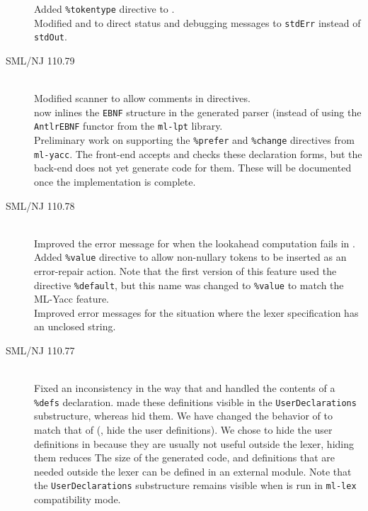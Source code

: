 \begin{description}
    Added \texttt{\%tokentype} directive to \mlantlr{}.
    \\[0.5em]
    Modified \mlantlr{} and \ulex{} to direct status and debugging messages to
    \texttt{stdErr} instead of \texttt{stdOut}.
%
 \item[SML/NJ 110.79]
    \mbox{}\\[0.5em]
    Modified scanner to allow comments in \ulex{} directives.
    \\[0.5em]
    \mlantlr{} now inlines the \texttt{EBNF} structure in the generated parser (instead of using
    the \texttt{AntlrEBNF} functor from the \texttt{ml-lpt} library.
    \\[0.5em]
    Preliminary work on supporting the \texttt{\%prefer} and \texttt{\%change} directives
    from \texttt{ml-yacc}.  The front-end accepts and checks these declaration forms, but
    the back-end does not yet generate code for them.  These will be documented once the
    implementation is complete.
%
  \item[SML/NJ 110.78]
    \mbox{}\\[0.5em]
    Improved the error message for when the lookahead computation fails in \mlantlr{}.
    \\[0.5em]
    Added \texttt{\%value} directive to allow non-nullary tokens to be inserted as
    an error-repair action.
    Note that the first version of this feature used the directive \texttt{\%default}, but
    this name was changed to \texttt{\%value} to match the ML-Yacc feature.
    \\[0.5em]
    Improved error messages for the situation where the lexer specification has an unclosed string.
%
  \item[SML/NJ 110.77]
    \mbox{}\\[0.5em]
    Fixed an inconsistency in the way that \mlantlr{} and \ulex{} handled the contents of
    a \texttt{\%defs} declaration.  \ulex{} made these definitions visible in the \texttt{UserDeclarations}
    substructure, whereas \mlantlr{} hid them.  We have changed the behavior of \ulex{} to match
    that of \mlantlr{} (\ie{}, hide the user definitions).  We chose to hide the user definitions
    in \ulex{} because they are usually not useful outside the lexer, hiding them reduces The
    size of the generated code, and definitions that are needed outside the lexer can be
    defined in an external module.  Note that the \texttt{UserDeclarations} substructure remains
    visible when \ulex{} is run in \texttt{ml-lex} compatibility mode.
    \\[0.5em]

\end{description}
